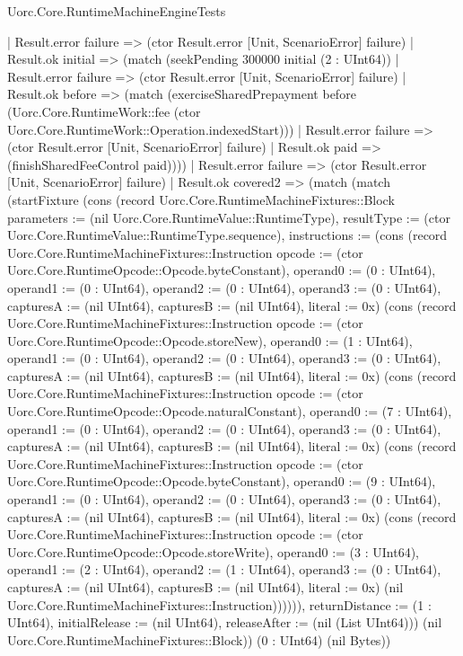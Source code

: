 \begin{lexlean}{Uorc.Core.RuntimeMachineEngineTests}
\begin{semanticmodule}
{          | Result.error failure => (ctor Result.error [Unit, ScenarioError] failure)
          | Result.ok initial => (match (seekPending 300000 initial (2 : UInt64))
            | Result.error failure => (ctor Result.error [Unit, ScenarioError] failure)
            | Result.ok before => (match (exerciseSharedPrepayment before (Uorc.Core.RuntimeWork::fee (ctor Uorc.Core.RuntimeWork::Operation.indexedStart)))
              | Result.error failure => (ctor Result.error [Unit, ScenarioError] failure)
              | Result.ok paid => (finishSharedFeeControl paid))))
        | Result.error failure => (ctor Result.error [Unit, ScenarioError] failure)
        | Result.ok covered2 => (match (match (startFixture (cons (record Uorc.Core.RuntimeMachineFixtures::Block {parameters := (nil Uorc.Core.RuntimeValue::RuntimeType), resultType := (ctor Uorc.Core.RuntimeValue::RuntimeType.sequence), instructions := (cons (record Uorc.Core.RuntimeMachineFixtures::Instruction {opcode := (ctor Uorc.Core.RuntimeOpcode::Opcode.byteConstant), operand0 := (0 : UInt64), operand1 := (0 : UInt64), operand2 := (0 : UInt64), operand3 := (0 : UInt64), capturesA := (nil UInt64), capturesB := (nil UInt64), literal := 0x}) (cons (record Uorc.Core.RuntimeMachineFixtures::Instruction {opcode := (ctor Uorc.Core.RuntimeOpcode::Opcode.storeNew), operand0 := (1 : UInt64), operand1 := (0 : UInt64), operand2 := (0 : UInt64), operand3 := (0 : UInt64), capturesA := (nil UInt64), capturesB := (nil UInt64), literal := 0x}) (cons (record Uorc.Core.RuntimeMachineFixtures::Instruction {opcode := (ctor Uorc.Core.RuntimeOpcode::Opcode.naturalConstant), operand0 := (7 : UInt64), operand1 := (0 : UInt64), operand2 := (0 : UInt64), operand3 := (0 : UInt64), capturesA := (nil UInt64), capturesB := (nil UInt64), literal := 0x}) (cons (record Uorc.Core.RuntimeMachineFixtures::Instruction {opcode := (ctor Uorc.Core.RuntimeOpcode::Opcode.byteConstant), operand0 := (9 : UInt64), operand1 := (0 : UInt64), operand2 := (0 : UInt64), operand3 := (0 : UInt64), capturesA := (nil UInt64), capturesB := (nil UInt64), literal := 0x}) (cons (record Uorc.Core.RuntimeMachineFixtures::Instruction {opcode := (ctor Uorc.Core.RuntimeOpcode::Opcode.storeWrite), operand0 := (3 : UInt64), operand1 := (2 : UInt64), operand2 := (1 : UInt64), operand3 := (0 : UInt64), capturesA := (nil UInt64), capturesB := (nil UInt64), literal := 0x}) (nil Uorc.Core.RuntimeMachineFixtures::Instruction)))))), returnDistance := (1 : UInt64), initialRelease := (nil UInt64), releaseAfter := (nil (List UInt64))}) (nil Uorc.Core.RuntimeMachineFixtures::Block)) (0 : UInt64) (nil Bytes))
}
\end{semanticmodule}
\end{lexlean}

